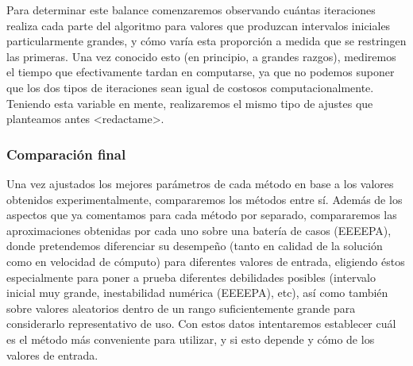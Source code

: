 Para determinar este balance comenzaremos observando cuántas iteraciones realiza cada parte del algoritmo para valores que produzcan intervalos iniciales particularmente grandes, y cómo varía esta proporción a medida que se restringen las primeras. Una vez conocido esto (en principio, a grandes razgos), mediremos el tiempo que efectivamente tardan en computarse, ya que no podemos suponer que los dos tipos de iteraciones sean igual de costosos computacionalmente. Teniendo esta variable en mente, realizaremos el mismo tipo de ajustes que planteamos antes <redactame>.

	\subsubsection{Comparación final}
Una vez ajustados los mejores parámetros de cada método en base a los valores obtenidos experimentalmente, compararemos los métodos entre sí. Además de los aspectos que ya comentamos para cada método por separado, compararemos las aproximaciones obtenidas por cada uno sobre una batería de casos (EEEEPA), donde pretendemos diferenciar su desempeño (tanto en calidad de la solución como en velocidad de cómputo) para diferentes valores de entrada, eligiendo éstos especialmente para poner a prueba diferentes debilidades posibles (intervalo inicial muy grande, inestabilidad numérica (EEEEPA), etc), así como también sobre valores aleatorios dentro de un rango suficientemente grande para considerarlo representativo de uso. Con estos datos intentaremos establecer cuál es el método más conveniente para utilizar, y si esto depende y cómo de los valores de entrada.


